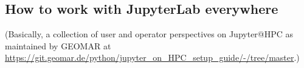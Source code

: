 \subsection{How to work with JupyterLab everywhere}

(Basically, a collection of user and operator perspectives on Jupyter@HPC as maintained by GEOMAR at \url{https://git.geomar.de/python/jupyter_on_HPC_setup_guide/-/tree/master}.)
